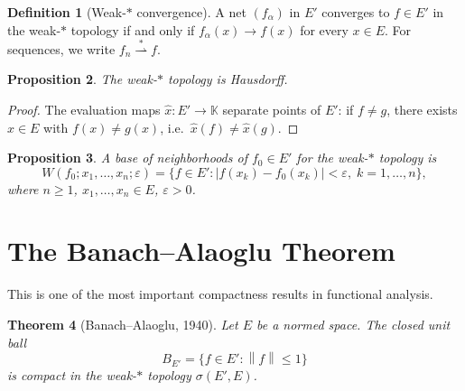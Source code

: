 \documentclass[a4paper,12pt]{book}
\newcommand{\K}{\mathbb{K}}
\newcommand{\norm}[1]{\left\| #1 \right\|}
\newcommand{\weakstarto}{\overset{*}{\rightharpoonup}}
\theoremstyle{definition}
\newtheorem{definition}{Definition}[chapter]
\theoremstyle{plain}
\newtheorem{theorem}[definition]{Theorem}
\newtheorem{proposition}[definition]{Proposition}
\theoremstyle{remark}
\begin{document}
\begin{definition}[Weak-$*$ convergence]\label{def:weak-star-convergence}
\index{$\weakstarto$}
A net $(f_\alpha)$ in $E'$ converges to $f\in E'$ in the weak-$*$ topology
if and only if $f_\alpha(x)\to f(x)$ for every $x\in E$.  For sequences, we
write $f_n\weakstarto f$.
\end{definition}

\begin{proposition}\label{prop:weak-star-hausdorff}
The weak-$*$ topology is Hausdorff.
\end{proposition}

\begin{proof}
The evaluation maps $\hat{x}:E'\to\K$ separate points of $E'$: if $f\ne g$,
there exists $x\in E$ with $f(x)\ne g(x)$, i.e.\ $\hat{x}(f)\ne\hat{x}(g)$.
\end{proof}

\begin{proposition}\label{prop:weak-star-nbhd}
A base of neighborhoods of $f_0\in E'$ for the weak-$*$ topology is
\[
  W(f_0;x_1,\ldots,x_n;\varepsilon) = \bigl\{f\in E': |f(x_k)-f_0(x_k)|<\varepsilon,
  \;k=1,\ldots,n\bigr\},
\]
where $n\ge 1$, $x_1,\ldots,x_n\in E$, $\varepsilon>0$.
\end{proposition}

\section{The Banach--Alaoglu Theorem}\label{sec:banach-alaoglu}

This is one of the most important compactness results in functional analysis.

\begin{theorem}[{Banach--Alaoglu, 1940}]\label{thm:banach-alaoglu}
Let $E$ be a normed space.  The closed unit ball
\[
  B_{E'} = \{f\in E': \norm{f}\le 1\}
\]
is compact in the weak-$*$ topology $\sigma(E',E)$.
\end{theorem}
\end{document}
